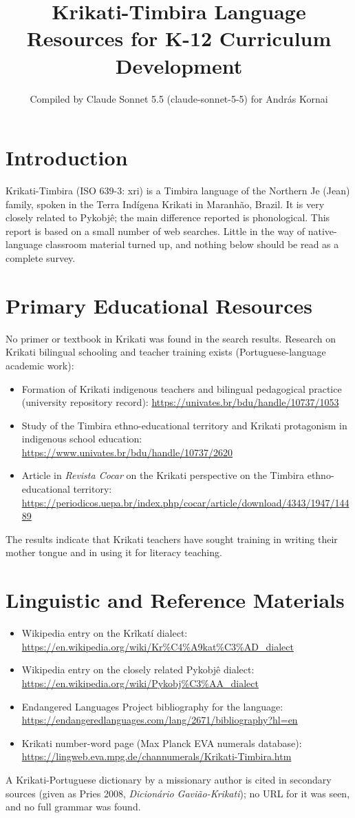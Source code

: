 \documentclass[12pt]{article}
\title{Krikati-Timbira Language Resources for K-12 Curriculum Development}
\author{Compiled by Claude Sonnet 5.5 (claude-sonnet-5-5) for Andr\'as Kornai}
\date{}
\begin{document}
\maketitle

\section{Introduction}
Krikati-Timbira (ISO 639-3: xri) is a Timbira language of the Northern Je (Jean) family, spoken in the Terra Ind\'igena Krikati in Maranh\~ao, Brazil. It is very closely related to Pykobj\^e; the main difference reported is phonological. This report is based on a small number of web searches. Little in the way of native-language classroom material turned up, and nothing below should be read as a complete survey.

\section{Primary Educational Resources}
No primer or textbook in Krikati was found in the search results. Research on Krikati bilingual schooling and teacher training exists (Portuguese-language academic work):
\begin{itemize}
\item Formation of Krikati indigenous teachers and bilingual pedagogical practice (university repository record): \url{https://univates.br/bdu/handle/10737/1053}
\item Study of the Timbira ethno-educational territory and Krikati protagonism in indigenous school education: \url{https://www.univates.br/bdu/handle/10737/2620}
\item Article in \emph{Revista Cocar} on the Krikati perspective on the Timbira ethno-educational territory: \url{https://periodicos.uepa.br/index.php/cocar/article/download/4343/1947/14489}
\end{itemize}
The results indicate that Krikati teachers have sought training in writing their mother tongue and in using it for literacy teaching.

\section{Linguistic and Reference Materials}
\begin{itemize}
\item Wikipedia entry on the Kr\~ikat\'i dialect: \url{https://en.wikipedia.org/wiki/Kr%C4%A9kat%C3%AD_dialect}
\item Wikipedia entry on the closely related Pykobj\^e dialect: \url{https://en.wikipedia.org/wiki/Pykobj%C3%AA_dialect}
\item Endangered Languages Project bibliography for the language: \url{https://endangeredlanguages.com/lang/2671/bibliography?hl=en}
\item Krikati number-word page (Max Planck EVA numerals database): \url{https://lingweb.eva.mpg.de/channumerals/Krikati-Timbira.htm}
\end{itemize}
A Krikati-Portuguese dictionary by a missionary author is cited in secondary sources (given as Pries 2008, \emph{Dicion\'ario Gavi\~ao-Krikati}); no URL for it was seen, and no full grammar was found.
\end{document}
